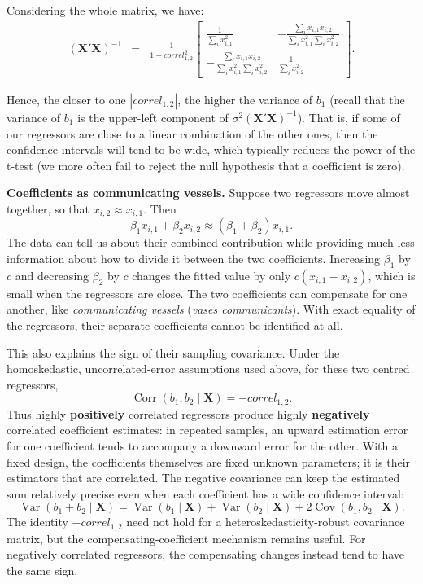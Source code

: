 \documentclass[
  11pt,
]{book}
\theoremstyle{definition}
\theoremstyle{definition}
\theoremstyle{definition}
\theoremstyle{definition}
\theoremstyle{remark}
\begin{document}
Considering the whole matrix, we have:
\begin{eqnarray*}
(\mathbf{X}'\mathbf{X})^{-1} &=& \frac{1}{1 - correl_{1,2}^2}\left[ \begin{array}{cc}
\frac{1}{\sum_i x_{i,1}^2}& - \frac{\sum_i x_{i,1} x_{i,2}}{\sum_i x_{i,1}^2\sum_i x_{i,2}^2}\\
- \frac{\sum_i x_{i,1} x_{i,2}}{\sum_i x_{i,1}^2\sum_i x_{i,2}^2} & \frac{1}{\sum_i x_{i,2}^2}
\end{array}\right].
\end{eqnarray*}

Hence, the closer to one \(|correl_{1,2}|\), the higher the variance of \(b_1\) (recall that the variance of \(b_1\) is the upper-left component of \(\sigma^2(\mathbf{X}'\mathbf{X})^{-1}\)). That is, if some of our regressors are close to a linear combination of the other ones, then the confidence intervals will tend to be wide, which typically reduces the power of the t-test (we more often fail to reject the null hypothesis that a coefficient is zero).

\textbf{Coefficients as communicating vessels.} Suppose two regressors move almost together, so that \(x_{i,2}\approx x_{i,1}\). Then
\[
\beta_1x_{i,1}+\beta_2x_{i,2}\approx(\beta_1+\beta_2)x_{i,1}.
\]
The data can tell us about their combined contribution while providing much less information about how to divide it between the two coefficients. Increasing \(\beta_1\) by \(c\) and decreasing \(\beta_2\) by \(c\) changes the fitted value by only \(c(x_{i,1}-x_{i,2})\), which is small when the regressors are close. The two coefficients can compensate for one another, like \emph{communicating vessels} (\emph{vases communicants}). With exact equality of the regressors, their separate coefficients cannot be identified at all.

This also explains the sign of their sampling covariance. Under the homoskedastic, uncorrelated-error assumptions used above, for these two centred regressors,
\[
\operatorname{Corr}(b_1,b_2\mid\mathbf{X})=-correl_{1,2}.
\]
Thus highly \textbf{positively} correlated regressors produce highly \textbf{negatively} correlated coefficient estimates: in repeated samples, an upward estimation error for one coefficient tends to accompany a downward error for the other. With a fixed design, the coefficients themselves are fixed unknown parameters; it is their estimators that are correlated. The negative covariance can keep the estimated sum relatively precise even when each coefficient has a wide confidence interval:
\[
\operatorname{Var}(b_1+b_2\mid\mathbf{X})=
\operatorname{Var}(b_1\mid\mathbf{X})+\operatorname{Var}(b_2\mid\mathbf{X})
+2\operatorname{Cov}(b_1,b_2\mid\mathbf{X}).
\]
The identity \(-correl_{1,2}\) need not hold for a heteroskedasticity-robust covariance matrix, but the compensating-coefficient mechanism remains useful. For negatively correlated regressors, the compensating changes instead tend to have the same sign.
\end{document}
